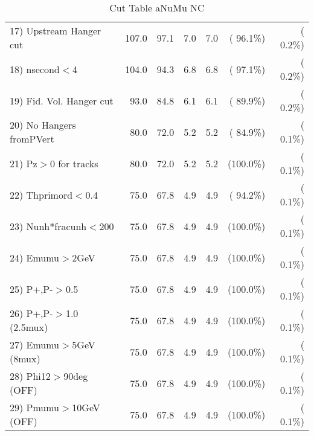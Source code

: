\begin{table}[h!]
\begin{tabular}{||l||r|r|r|r|r|r||}
 17) Upstream Hanger cut  &        107.0 &         97.1 &          7.0 &          7.0 & ( 96.1\%) & (  0.2\%) \\
 18) nsecond$<$4          &        104.0 &         94.3 &          6.8 &          6.8 & ( 97.1\%) & (  0.2\%) \\
 19) Fid. Vol. Hanger cut &         93.0 &         84.8 &          6.1 &          6.1 & ( 89.9\%) & (  0.2\%) \\
 20) No Hangers fromPVert &         80.0 &         72.0 &          5.2 &          5.2 & ( 84.9\%) & (  0.1\%) \\
 21) Pz$>$0 for tracks    &         80.0 &         72.0 &          5.2 &          5.2 & (100.0\%) & (  0.1\%) \\
 22) Thprimord$<$0.4      &         75.0 &         67.8 &          4.9 &          4.9 & ( 94.2\%) & (  0.1\%) \\
 23) Nunh*fracunh$<$200   &         75.0 &         67.8 &          4.9 &          4.9 & (100.0\%) & (  0.1\%) \\
 24) Emumu$>$2GeV         &         75.0 &         67.8 &          4.9 &          4.9 & (100.0\%) & (  0.1\%) \\
 25) P+,P-$>$0.5          &         75.0 &         67.8 &          4.9 &          4.9 & (100.0\%) & (  0.1\%) \\
 26) P+,P-$>$1.0 (2.5mux) &         75.0 &         67.8 &          4.9 &          4.9 & (100.0\%) & (  0.1\%) \\
 27) Emumu$>$5GeV  (8mux) &         75.0 &         67.8 &          4.9 &          4.9 & (100.0\%) & (  0.1\%) \\
 28) Phi12$>$90deg  (OFF) &         75.0 &         67.8 &          4.9 &          4.9 & (100.0\%) & (  0.1\%) \\
 29) Pmumu$>$10GeV  (OFF) &         75.0 &         67.8 &          4.9 &          4.9 & (100.0\%) & (  0.1\%) \\
 \hline
 \hline
 \end{tabular}
 \caption{Cut Table  aNuMu NC }
 \label{tab-cutcohjpsi-mumu_anumunc}
 \end{table}
